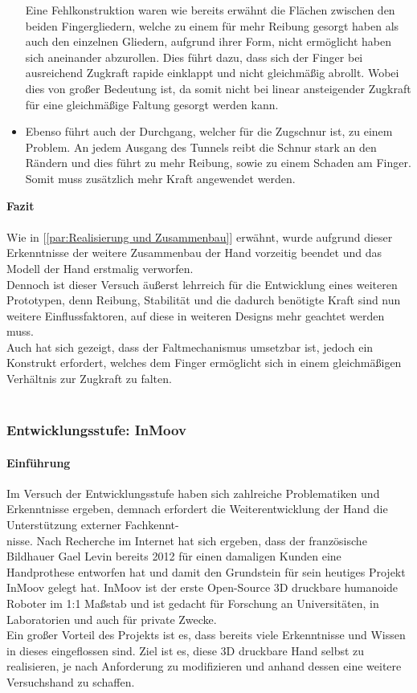 \documentclass[titlepage,12pt,twoside]{article}
\begin{document}
\begin{itemize}
	Eine Fehlkonstruktion waren wie bereits erwähnt die Flächen zwischen den 
	beiden Fingergliedern, welche zu einem für mehr Reibung gesorgt haben als auch den einzelnen 
	Gliedern, aufgrund ihrer Form, nicht ermöglicht haben 
	sich aneinander abzurollen. Dies führt dazu, dass sich der Finger bei ausreichend 
	Zugkraft rapide einklappt und nicht gleichmäßig abrollt.  Wobei dies von großer 
	Bedeutung ist, da somit nicht bei linear ansteigender Zugkraft für eine 
	gleichmäßige Faltung gesorgt werden kann.
	\item Ebenso führt auch der Durchgang, welcher für die Zugschnur ist, zu 
	einem Problem. An jedem Ausgang des Tunnels reibt die Schnur stark an den 
	Rändern und dies führt zu mehr Reibung, sowie zu einem Schaden am Finger.
	Somit muss zusätzlich mehr Kraft angewendet werden.
\end{itemize}
\hfill \break
\textbf{Fazit} \\
\\
Wie in [\textcolor{blue}{\autoref{par:Realisierung und Zusammenbau}}] erwähnt, wurde aufgrund 
dieser Erkenntnisse der weitere Zusammenbau der Hand vorzeitig beendet und das 
Modell der Hand erstmalig verworfen. \\
Dennoch ist dieser Versuch äußerst lehrreich für die Entwicklung eines weiteren 
Prototypen, denn Reibung, Stabilität und die dadurch benötigte Kraft sind nun 
weitere Einflussfaktoren, auf diese in weiteren Designs mehr geachtet werden 
muss. \\
Auch hat sich gezeigt, dass der Faltmechanismus umsetzbar ist, jedoch ein Konstrukt 
erfordert, welches dem Finger ermöglicht sich in einem gleichmäßigen Verhältnis 
zur Zugkraft zu falten. \\
\\

\subsubsection{Entwicklungsstufe: InMoov}
\label{chap:Entwicklungsstufe: InMoov}
\paragraph{Einführung}
\hfill \break
\hfill \break
Im Versuch der Entwicklungsstufe  haben sich zahlreiche Problematiken und 
Erkenntnisse ergeben, demnach erfordert die Weiterentwicklung der Hand 
die Unterstützung externer Fachkennt-\\nisse.
Nach Recherche im Internet hat sich ergeben, dass der französische 
Bildhauer Gael Levin bereits 2012 für einen damaligen Kunden eine Handprothese 
entworfen hat und damit den Grundstein für sein heutiges Projekt 
InMoov gelegt hat. InMoov ist der erste Open-Source 3D druckbare humanoide 
Roboter im 1:1 Maßstab und ist gedacht für Forschung an Universitäten, in 
Laboratorien und auch für private Zwecke. \\
Ein großer Vorteil des Projekts ist es, dass bereits viele Erkenntnisse und 
Wissen in dieses eingeflossen sind. Ziel ist es, diese 3D druckbare Hand 
selbst zu realisieren, je nach Anforderung zu modifizieren und anhand dessen 
eine weitere Versuchshand zu schaffen. \\
\newpage
\end{document}

